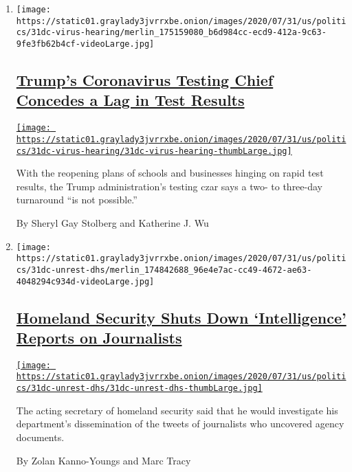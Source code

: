 \begin{enumerate}
\def\labelenumi{\arabic{enumi}.}
\item
  \texttt{[image: https://static01.graylady3jvrrxbe.onion/images/2020/07/31/us/politics/31dc-virus-hearing/merlin\_175159080\_b6d984cc-ecd9-412a-9c63-9fe3fb62b4cf-videoLarge.jpg]}

  \hypertarget{trumps-coronavirus-testing-chief-concedes-a-lag-in-test-results}{%
  \subsection{\texorpdfstring{\href{/2020/07/31/us/politics/trump-coronavirus-testing.html}{Trump's
  Coronavirus Testing Chief Concedes a Lag in Test
  Results}}{Trump's Coronavirus Testing Chief Concedes a Lag in Test Results}}\label{trumps-coronavirus-testing-chief-concedes-a-lag-in-test-results}}

  \href{/2020/07/31/us/politics/trump-coronavirus-testing.html}{\texttt{[image: https://static01.graylady3jvrrxbe.onion/images/2020/07/31/us/politics/31dc-virus-hearing/31dc-virus-hearing-thumbLarge.jpg]}}

  With the reopening plans of schools and businesses hinging on rapid
  test results, the Trump administration's testing czar says a two- to
  three-day turnaround ``is not possible.''

  By Sheryl Gay Stolberg and Katherine J. Wu
\item
  \texttt{[image: https://static01.graylady3jvrrxbe.onion/images/2020/07/31/us/politics/31dc-unrest-dhs/merlin\_174842688\_96e4e7ac-cc49-4672-ae63-4048294c934d-videoLarge.jpg]}

  \hypertarget{homeland-security-shuts-down-intelligence-reports-on-journalists}{%
  \subsection{\texorpdfstring{\href{/2020/07/31/us/politics/homeland-security-portland.html}{Homeland
  Security Shuts Down `Intelligence' Reports on
  Journalists}}{Homeland Security Shuts Down `Intelligence' Reports on Journalists}}\label{homeland-security-shuts-down-intelligence-reports-on-journalists}}

  \href{/2020/07/31/us/politics/homeland-security-portland.html}{\texttt{[image: https://static01.graylady3jvrrxbe.onion/images/2020/07/31/us/politics/31dc-unrest-dhs/31dc-unrest-dhs-thumbLarge.jpg]}}

  The acting secretary of homeland security said that he would
  investigate his department's dissemination of the tweets of
  journalists who uncovered agency documents.

  By Zolan Kanno-Youngs and Marc Tracy
\end{enumerate}

